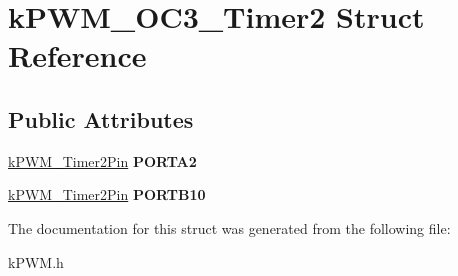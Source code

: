 \hypertarget{structkPWM__OC3__Timer2}{}\section{k\+P\+W\+M\+\_\+\+O\+C3\+\_\+\+Timer2 Struct Reference}
\label{structkPWM__OC3__Timer2}
\subsection*{Public Attributes}
\begin{DoxyCompactItemize}
\item 
\hyperlink{structkPWM__Timer2Pin}{k\+P\+W\+M\+\_\+\+Timer2\+Pin} {\bfseries P\+O\+R\+T\+A2}\hypertarget{structkPWM__OC3__Timer2_aebe91e1c8347e02c0a7d821ba0aca283}{}\label{structkPWM__OC3__Timer2_aebe91e1c8347e02c0a7d821ba0aca283}

\item 
\hyperlink{structkPWM__Timer2Pin}{k\+P\+W\+M\+\_\+\+Timer2\+Pin} {\bfseries P\+O\+R\+T\+B10}\hypertarget{structkPWM__OC3__Timer2_a22ec5c07d2dc71f62e8be05d9c728497}{}\label{structkPWM__OC3__Timer2_a22ec5c07d2dc71f62e8be05d9c728497}

\end{DoxyCompactItemize}


The documentation for this struct was generated from the following file\+:\begin{DoxyCompactItemize}
\item 
k\+P\+W\+M.\+h\end{DoxyCompactItemize}
